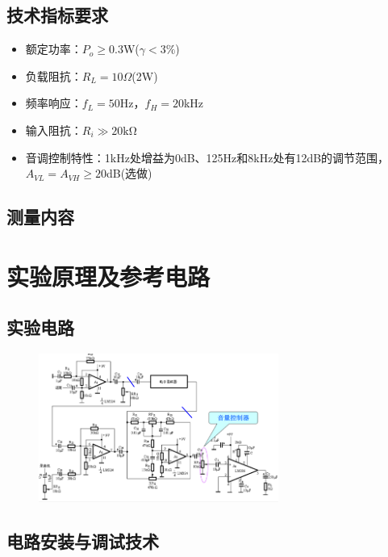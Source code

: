 \documentclass[a4paper,11pt,UTF8]{article}
\numberwithin{equation}{subsection}
\begin{document}
\subsection{技术指标要求}
\begin{itemize}
	\setlength{\itemsep}{0pt}	
	\item 额定功率：$P_o\geq0.3$W($\gamma< 3\%$)
	\item 负载阻抗：$R_L=10\Omega$(2W)
	\item 频率响应：$f_L=50$Hz，$f_H=20$kHz
	\item 输入阻抗：$R_i\gg20\mathrm{k\Omega}$
	\item 音调控制特性：1kHz处增益为0dB、125Hz和8kHz处有12dB的调节范围，$A_{VL}=A_{VH}≥20$dB(选做)
	
\end{itemize}
\subsection{测量内容}
\section{实验原理及参考电路}
\subsection{实验电路}
\begin{figure}[H]
	\centering
	\includegraphics[width=0.7\textwidth]{1.png}
\end{figure}
\subsection{电路安装与调试技术}
\end{document}
